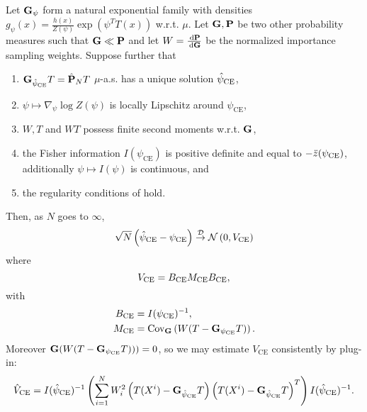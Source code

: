 \begin{theorem}
    \label{thm:ce-clt}
    Let $\mathbf G_{\psi}$ form a natural exponential family with densities $g_{\psi}(x) = \frac{h(x)}{Z(\psi)} \exp \left( \psi^{T}T(x)\right) $ w.r.t. $\mu$. Let $\mathbf G, \mathbf P$ be two other probability measures such that $\mathbf G \ll \mathbf P$ and let $W = \frac{\,\mathrm d \mathbf P}{\,\mathrm d \mathbf G}$ be the normalized importance sampling weights. 
    Suppose further that 
    \begin{enumerate}[label={\bfseries(A{\arabic*})}]
        \item\label{it:exist-unique-psice} $\mathbf G_{{\hat\psi_{\text{CE}}}} T = \hat{\mathbf P}_{N} T$ $\mu$-a.s. has a unique solution ${\hat\psi_{\text{CE}}}$,
        \item\label{it:zdot-ll} $\psi \mapsto \nabla_\psi \log Z(\psi)$ is locally Lipschitz around $\psi_{\text{CE}}$,
        \item\label{it:w-t-wt-L2} $W,T$ and $WT$ possess finite second moments  w.r.t. $\mathbf G$,
        \item\label{it:FI-psd} the Fisher information $I(\psi_{\text{CE}})$ is positive definite and equal to $-\ddot z({\psi_{\text{CE}}})$, additionally $\psi \mapsto I(\psi)$ is continuous, and
        \item\label{it:ce-regularity} the regularity conditions of  hold.
    \end{enumerate}

    Then, as $N$ goes to $\infty$,
    $$
        \sqrt{N} \left(\hat\psi_\text{CE} - \psi_{\text{CE}}\right) \stackrel{\mathcal D}{\to} \mathcal N \left(0, V_{\text{CE}}\right)
    $$
    where 
    $$
    V_{\text{CE}} = B_\ce M_\ce B_\ce,%
    $$
    with 
    \begin{align*}
        B_{{\text{CE}}} &= I({\psi_{\text{CE}}})^{-1}, \\
        M_{{\text{CE}}} &= \text{Cov}_{\mathbf G} \left( W (T - \mathbf G_{{\psi_{\text{CE}}}}T) \right).
    \end{align*}
    Moreover $\mathbf G (W(T - \mathbf G_{{\psi_{\text{CE}}}}T))) = 0$, so we may estimate $V_{\text{CE}}$ consistently by plug-in:
    $$
    \hat V_{\text{CE}} = I(\hat\psi_{\text{CE}})^{-1}  \left(\sum_{i = 1}^N W^{2}_{i} \left(T(X^{i}) - \mathbf G_{{\hat\psi_{\text{CE}}}}T \right)\left(T(X^{i}) - \mathbf G_{{\hat\psi_{\text{CE}}}} T\right)^{T} \right)I(\hat\psi_{\text{CE}})^{-1}.
    $$
\end{theorem}

